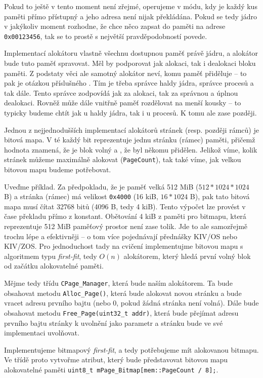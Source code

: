 \documentclass{article}
\begin{document}
Pokud to ještě v tento moment není zřejmé, operujeme v módu, kdy je každý kus paměti přímo přístupný a jeho adresa není nijak překládána. Pokud se tedy jádro v jakýkoliv moment rozhodne, že chce něco zapsat do paměti na adrese \texttt{0x00123456}, tak se to prostě s největší pravděpodobností povede.

Implementací alokátoru vlastně všechnu dostupnou paměť  právě jádru, a alokátor bude tuto paměť spravovat. Měl by podporovat jak alokaci, tak i dealokaci bloku paměti. Z podstaty věci ale samotný alokátor neví, komu paměť přiděluje -- to pak je otázkou příslušného . Tím je třeba správce haldy jádra, správce procesů a tak dále. Tento správce zodpovídá jak za  alokaci, tak za správnou a úplnou dealokaci. Rovněž může dále vnitřně paměť rozdělovat na menší kousky -- to typicky budeme chtít jak u haldy jádra, tak i u procesů. K tomu ale zase později.

Jednou z nejjednodušších implementací alokátorů stránek (resp. později rámců) je bitová mapa. V té každý bit reprezentuje jednu stránku (rámec) paměti, přičemž hodnota  znamená, že je blok volný a , že byl někomu přidělen. Jelikož víme, kolik stránek můžeme maximálně alokovat (\texttt{PageCount}), tak také víme, jak velkou bitovou mapu budeme potřebovat.

Uveďme příklad. Za předpokladu, že je paměť velká 512 MiB ($512*1024*1024$ B) a stránka (rámec) má velikost \texttt{0x4000} (16 kiB, $16*1024$ B), pak tato bitová mapa musí čítat 32768 bitů (4096 B, tedy 4 kiB). Tento výpočet lze provést v čase překladu přímo z konstant. Obětování 4 kiB z paměti pro bitmapu, která reprezentuje 512 MiB paměťový prostor není zase tolik. Jde to ale samozřejmě trochu lépe a efektivněji -- o tom více pojednávají přednášky KIV/OS nebo KIV/ZOS. Pro jednoduchost tady na cvičení implementujme bitovou mapu s algoritmem typu \emph{first-fit}, tedy $O(n)$ alokátorem, který hledá první volný blok od začátku alokovatelné paměti.

Mějme tedy třídu \texttt{CPage\_Manager}, která bude naším alokátorem. Ta bude obsahovat metodu \texttt{Alloc\_Page()}, která bude alokovat novou stránku a bude vracet adresu prvního bajtu (nebo 0, pokud žádná stránka není volná). Dále bude obsahovat metodu \texttt{Free\_Page(uint32\_t addr)}, která bude přejímat adresu prvního bajtu stránky k uvolnění jako parametr a stránku bude ve své implementaci uvolňovat.

Implementujeme bitmapový \emph{first-fit}, a tedy potřebujeme mít alokovanou bitmapu. Ve třídě proto vytvořme atribut, který bude představovat bitovou mapu alokovatelné paměti \texttt{uint8\_t mPage\_Bitmap[mem::PageCount / 8];}.
\end{document}
